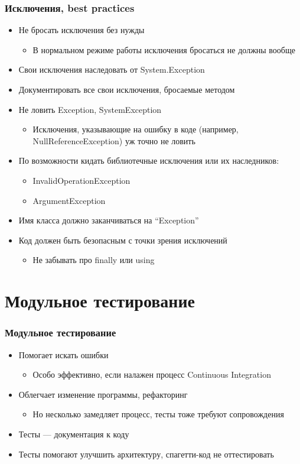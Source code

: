 \documentclass[xetex,mathserif,serif]{beamer}
\begin{document}
	\begin{frame}
		\frametitle{Исключения, best practices}
		\begin{itemize}
			\item Не бросать исключения без нужды
			\begin{itemize}
				\item В нормальном режиме работы исключения бросаться не должны вообще
			\end{itemize}
			\item Свои исключения наследовать от System.Exception
			\item Документировать все свои исключения, бросаемые методом
			\item Не ловить Exception, SystemException
			\begin{itemize}
				\item Исключения, указывающие на ошибку в коде (например, NullReferenceException) уж точно не ловить
			\end{itemize}
			\item По возможности кидать библиотечные исключения или их наследников:
			\begin{itemize}
				\item InvalidOperationException
				\item ArgumentException
			\end{itemize}
			\item Имя класса должно заканчиваться на ``Exception''
			\item Код должен быть безопасным с точки зрения исключений
			\begin{itemize}
				\item Не забывать про finally или using
			\end{itemize}
		\end{itemize}
	\end{frame}

	\section{Модульное тестирование}

	\begin{frame}
		\frametitle{Модульное тестирование}
		\begin{itemize}
			\item Помогает искать ошибки
			\begin{itemize}
				\item Особо эффективно, если налажен процесс Continuous Integration
			\end{itemize}
			\item Облегчает изменение программы, рефакторинг
			\begin{itemize}
				\item Но несколько замедляет процесс, тесты тоже требуют сопровождения
			\end{itemize}
			\item Тесты --- документация к коду
			\item Тесты помогают улучшить архитектуру, спагетти-код не оттестировать
		\end{itemize}
	\end{frame}
\end{document}
